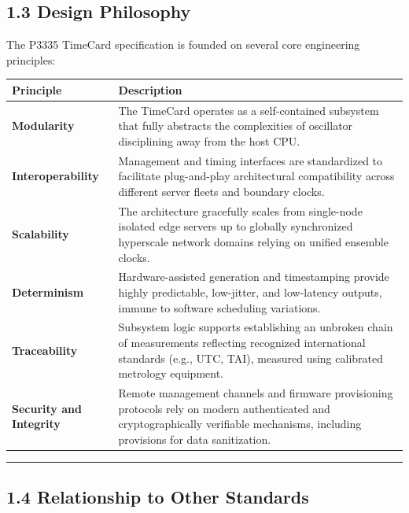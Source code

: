 \documentclass[
]{article}
\newcounter{none} %
\begin{document}
\subsection{1.3 Design Philosophy}\label{design-philosophy}

The P3335 TimeCard specification is founded on several core engineering
principles:

{\def\LTcaptype{none} %
\begin{longtable}[]{@{}
  >{\raggedright\arraybackslash}p{}
  >{\raggedright\arraybackslash}p{}@{}}
\toprule\noalign{}
Principle & Description \\
\midrule\noalign{}
\endhead
\bottomrule\noalign{}
\endlastfoot
\textbf{Modularity} & The TimeCard operates as a self-contained
subsystem that fully abstracts the complexities of oscillator
disciplining away from the host CPU. \\
\textbf{Interoperability} & Management and timing interfaces are
standardized to facilitate plug-and-play architectural compatibility
across different server fleets and boundary clocks. \\
\textbf{Scalability} & The architecture gracefully scales from
single-node isolated edge servers up to globally synchronized hyperscale
network domains relying on unified ensemble clocks. \\
\textbf{Determinism} & Hardware-assisted generation and timestamping
provide highly predictable, low-jitter, and low-latency outputs, immune
to software scheduling variations. \\
\textbf{Traceability} & Subsystem logic supports establishing an
unbroken chain of measurements reflecting recognized international
standards (e.g., UTC, TAI), measured using calibrated metrology
equipment. \\
\textbf{Security and Integrity} & Remote management channels and
firmware provisioning protocols rely on modern authenticated and
cryptographically verifiable mechanisms, including provisions for data
sanitization. \\
\end{longtable}
}

\begin{center}\rule{0.5\linewidth}{0.5pt}\end{center}

\subsection{1.4 Relationship to Other
Standards}\label{relationship-to-other-standards}
\end{document}

